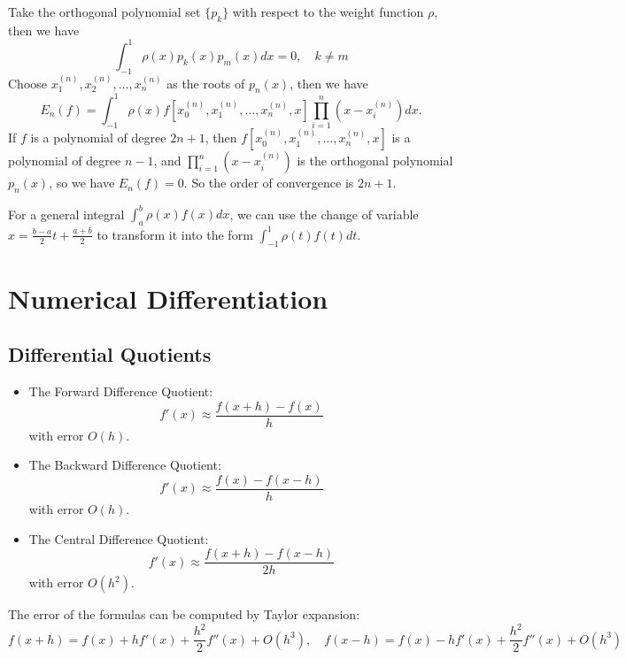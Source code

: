 \documentclass{matharticle}
\begin{document}
Take the orthogonal polynomial set $\{p_k\}$ with respect to the weight function $\rho$, then we have
\begin{equation}
	\int_{-1}^{1} \rho(x) p_k(x) p_m(x) dx = 0, \quad k \neq m
\end{equation}
Choose $x_1^{(n)}, x_2^{(n)}, \ldots, x_n^{(n)}$ as the roots of $p_{n}(x)$, then we have
\begin{equation}
	E_n(f) = \int_{-1}^{1} \rho(x) f[x_0^{(n)}, x_1^{(n)}, \ldots, x_n^{(n)}, x] \prod_{i=1}^{n} (x - x_i^{(n)}) dx.
\end{equation}
If $f$ is a polynomial of degree $2n+1$, then $f[x_0^{(n)}, x_1^{(n)}, \ldots, x_n^{(n)}, x]$ is a polynomial of degree $n-1$, and $\prod_{i=1}^{n} (x - x_i^{(n)})$ is the orthogonal polynomial $p_n(x)$, so we have $E_n(f) = 0$. So the order of convergence is $2n+1$.

For a general integral $\int_{a}^{b} \rho(x) f(x) dx$, we can use the change of variable $x = \frac{b-a}{2} t + \frac{a+b}{2}$ to transform it into the form $\int_{-1}^{1} \rho(t) f(t) dt$.

\section{Numerical Differentiation}

\subsection{Differential Quotients}
\begin{itemize}
	\item The Forward Difference Quotient:
	      \begin{equation}
		      f'(x) \approx \frac{f(x+h) - f(x)}{h}
	      \end{equation}
	      with error $O(h)$.
	\item The Backward Difference Quotient:
	      \begin{equation}
		      f'(x) \approx \frac{f(x) - f(x-h)}{h}
	      \end{equation}
	      with error $O(h)$.
	\item The Central Difference Quotient:
	      \begin{equation}
		      f'(x) \approx \frac{f(x+h) - f(x-h)}{2h}
	      \end{equation}
	      with error $O(h^2)$.
\end{itemize}
The error of the formulas can be computed by Taylor expansion:
\begin{equation*}
	f(x+h) = f(x) + h f'(x) + \frac{h^2}{2} f''(x) + O(h^3), \quad f(x-h) = f(x) - h f'(x) + \frac{h^2}{2} f''(x) + O(h^3)
\end{equation*}
\end{document}
